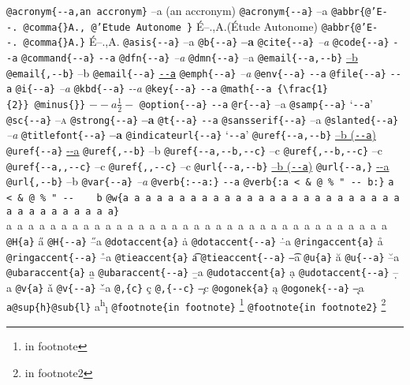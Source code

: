 \documentclass{book}
\newcommand\GNUTexinfocommandstyletextcite[1]{{\normalfont{}\textsl{#1}}}%
\newcommand\GNUTexinfocommandstyletextkbd[1]{{\ttfamily\textsl{#1}}}%
\newcommand\GNUTexinfocommandstyletextvar[1]{{\normalfont{}\textsl{#1}}}%
\begin{document}
\texttt{@acronym\{{-}{-}a,an accronym\}} --a (an accronym)
\texttt{@acronym\{{-}{-}a\}} --a
\texttt{@abbr\{@'E{-}{-}.\ @comma\{\}A.,\ @'Etude Autonome \}} \'{E}--.\@ ,A.\@ (\'{E}tude Autonome)
\texttt{@abbr\{@'E{-}{-}.\ @comma\{\}A.\}} \'{E}--.\@ ,A.\@
\texttt{@asis\{{-}{-}a\}} --a
\texttt{@b\{{-}{-}a\}} \textbf{--a}
\texttt{@cite\{{-}{-}a\}} \GNUTexinfocommandstyletextcite{--a}
\texttt{@code\{{-}{-}a\}} \texttt{{-}{-}a}
\texttt{@command\{{-}{-}a\}} \texttt{{-}{-}a}
\texttt{@dfn\{{-}{-}a\}} \textsl{--a}
\texttt{@dmn\{{-}{-}a\}} \thinspace --a
\texttt{@email\{{-}{-}a,{-}{-}b\}} \href{mailto:--a}{--b}
\texttt{@email\{,{-}{-}b\}} --b
\texttt{@email\{{-}{-}a\}} \href{mailto:--a}{\nolinkurl{--a}}
\texttt{@emph\{{-}{-}a\}} \emph{--a}
\texttt{@env\{{-}{-}a\}} \texttt{{-}{-}a}
\texttt{@file\{{-}{-}a\}} \texttt{{-}{-}a}
\texttt{@i\{{-}{-}a\}} \textit{--a}
\texttt{@kbd\{{-}{-}a\}} \GNUTexinfocommandstyletextkbd{{-}{-}a}
\texttt{@key\{{-}{-}a\}} \texttt{{-}{-}a}
\texttt{@math\{{-}{-}a \{\textbackslash{}frac\{1\}\{2\}\}\ @minus\{\}\}} $--a {\frac{1}{2}} -$
\texttt{@option\{{-}{-}a\}} \texttt{{-}{-}a}
\texttt{@r\{{-}{-}a\}} \textnormal{--a}
\texttt{@samp\{{-}{-}a\}} `\texttt{{-}{-}a}'
\texttt{@sc\{{-}{-}a\}} \textsc{--a}
\texttt{@strong\{{-}{-}a\}} \textbf{--a}
\texttt{@t\{{-}{-}a\}} \texttt{{-}{-}a}
\texttt{@sansserif\{{-}{-}a\}} \textsf{--a}
\texttt{@slanted\{{-}{-}a\}} \textsl{--a}
\texttt{@titlefont\{{-}{-}a\}} {\huge \bfseries --a}
\texttt{@indicateurl\{{-}{-}a\}} `\texttt{{-}{-}a}'
\texttt{@uref\{{-}{-}a,{-}{-}b\}} \href{--a}{--b (\nolinkurl{--a})}
\texttt{@uref\{{-}{-}a\}} \url{--a}
\texttt{@uref\{,{-}{-}b\}} --b
\texttt{@uref\{{-}{-}a,{-}{-}b,{-}{-}c\}} --c
\texttt{@uref\{,{-}{-}b,{-}{-}c\}} --c
\texttt{@uref\{{-}{-}a{,}{,}{-}{-}c\}} --c
\texttt{@uref\{{,}{,}{-}{-}c\}} --c
\texttt{@url\{{-}{-}a,{-}{-}b\}} \href{--a}{--b (\nolinkurl{--a})}
\texttt{@url\{{-}{-}a,\}} \url{--a}
\texttt{@url\{,{-}{-}b\}} --b
\texttt{@var\{{-}{-}a\}} \GNUTexinfocommandstyletextvar{--a}
\texttt{@verb\{:{-}{-}a:\}} \verb:--a:
\texttt{@verb\{:a  < \& @\ \% " {-}{-}    b:\}} \verb:a  < & @ % " --    b:
\texttt{@w\{a a a a a a a a a a a a a a a a a a a a a a a a a a a a a a a a a a a\}} \hbox{a a a a a a a a a a a a a a a a a a a a a a a a a a a a a a a a a a a}
\texttt{@H\{a\}} \H{a}
\texttt{@H\{{-}{-}a\}} \H{--a}
\texttt{@dotaccent\{a\}} \.{a}
\texttt{@dotaccent\{{-}{-}a\}} \.{--a}
\texttt{@ringaccent\{a\}} \r{a}
\texttt{@ringaccent\{{-}{-}a\}} \r{--a}
\texttt{@tieaccent\{a\}} \t{a}
\texttt{@tieaccent\{{-}{-}a\}} \t{--a}
\texttt{@u\{a\}} \u{a}
\texttt{@u\{{-}{-}a\}} \u{--a}
\texttt{@ubaraccent\{a\}} \b{a}
\texttt{@ubaraccent\{{-}{-}a\}} \b{--a}
\texttt{@udotaccent\{a\}} \d{a}
\texttt{@udotaccent\{{-}{-}a\}} \d{--a}
\texttt{@v\{a\}} \v{a}
\texttt{@v\{{-}{-}a\}} \v{--a}
\texttt{@,\{c\}} \c{c}
\texttt{@,\{{-}{-}c\}} \c{--c}
\texttt{@ogonek\{a\}} \k{a}
\texttt{@ogonek\{{-}{-}a\}} \k{--a}
\texttt{a@sup\{h\}@sub\{l\}} a\textsuperscript{h}\textsubscript{l}
\texttt{@footnote\{in footnote\}} \footnote{in footnote}
\texttt{@footnote\{in footnote2\}} \footnote{in footnote2}
\end{document}
